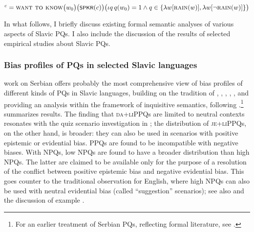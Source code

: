 \documentclass[output=paper,colorlinks,citecolor=brown]{langscibook}
\begin{document}
\ea{}$^c=\textsc{want to know}\big(w_0\big)\big(\cnst{spkr}(c)\big)\big(\iota q\,q(w_0)=1\wedge q\in\{\lambda w[\textsc{rain}(w)],\lambda w[\neg\textsc{rain}(w)]\}\big)$\label{sim:denot:info-seek}
\z

\noindent In what follows, I briefly discuss existing formal semantic analyses of various aspects of Slavic PQs. I also include the discussion of the results of selected empirical studies about Slavic PQs.

\subsubsection{Bias profiles of PQs in selected Slavic languages}\label{sim:sec:bias-slavic}

 work on Serbian offers probably the most comprehensive view of bias profiles of different kinds of PQs in Slavic languages, building on the tradition of \citet{Ladd1981}, \citet{Buring.Gunlogson2000}, \citet{Romero.Han2004}, \citet{Sudo2013}, \citet{Gartner.Gyuris2017}, and providing an analysis within the framework of inquisitive semantics, following \citet{AnderBois2019}.\footnote{For an earlier treatment of Serbian PQs, reflecting formal literature, see \citet{Rakic1984}.}  summarizes  results. The finding that \textsc{da+liPPQ}s are limited to neutral contexts resonates with the quiz scenario investigation in ; the distribution of \textsc{je+li}PPQs, on the other hand, is broader: they can also be used in scenarios with positive epistemic or evidential bias. PPQs are found to be incompatible with negative biases. With NPQs, low NPQs are found to have a broader distribution than high NPQs. The latter are claimed to be available only for the purpose of a resolution of the conflict between positive epistemic bias and negative evidential bias. This goes counter to the traditional observation for English, where high NPQs can also be used with neutral evidential bias (called ``suggestion'' scenarios); see also  and the discussion of example .
\end{document}
